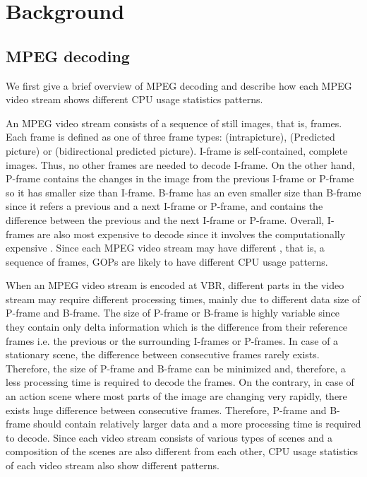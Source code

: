 \section{Background}
\label{sec:background}
\subsection{MPEG decoding}
We first give a brief overview of MPEG decoding and describe how each MPEG video stream shows different CPU usage statistics patterns. 

An MPEG video stream consists of a sequence of still images, that is, frames. 
Each frame is defined as one of three frame types:  (intrapicture),  (Predicted picture) or  (bidirectional predicted picture).
I-frame is self-contained, complete images.  
Thus, no other frames are needed to decode I-frame.
On the other hand, P-frame contains the changes in the image from the previous I-frame or P-frame so it has smaller size than I-frame.
B-frame has an even smaller size than B-frame since it refers a previous and a next I-frame or P-frame, and contains the difference between the previous and the next I-frame or P-frame. 
Overall, I-frames are also most expensive to decode since it involves the computationally expensive .
Since each MPEG video stream may have different , that is, a sequence of frames, GOPs are likely to have different CPU usage patterns. 

When an MPEG video stream is encoded at VBR, different parts in the video stream may require different processing times, mainly due to different data size of P-frame and B-frame. 
The size of P-frame or B-frame is highly variable since they contain only delta information which is the difference from their reference frames i.e. the previous or the surrounding I-frames or P-frames.
In case of a stationary scene, the difference between consecutive frames rarely exists. 
Therefore, the size of P-frame and B-frame can be minimized and, therefore, a less processing time is required to decode the frames.
On the contrary, in case of an action scene where most parts of the image are changing very rapidly, there exists huge difference between consecutive frames.
Therefore, P-frame and B-frame should contain relatively larger data and a more processing time is required to decode.
Since each video stream consists of various types of scenes and a composition of the scenes are also different from each other, CPU usage statistics of each video stream also show different patterns. 